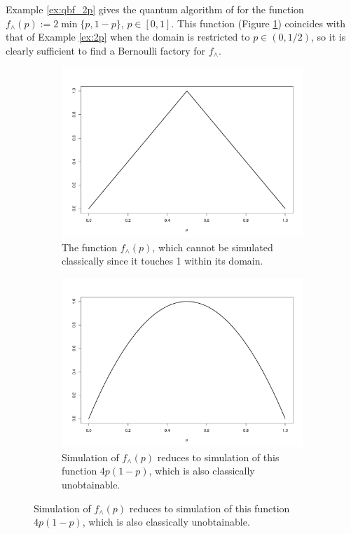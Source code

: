 \documentclass{article}
\theoremstyle{definition}
\begin{document}
Example \ref{ex:qbf_2p} gives the quantum algorithm of \citet{dale2015} for the function $f_\wedge(p) := 2\min\{p, 1-p\}$, $p\in[0,1]$. This function (Figure \ref{fig:wedge_fn}) coincides with that of Example \ref{ex:2p} when the domain is restricted to $p\in(0,1/2)$, so it is clearly sufficient to find a Bernoulli factory for $f_\wedge$.

\begin{figure}
\centering
\begin{subfigure}{0.45\linewidth}
\centering
\includegraphics[width=\textwidth]{wedge_function.pdf}
\caption{The function $f_\wedge(p)$, which cannot be simulated classically since it touches 1 within its domain.}
\label{fig:wedge_fn}
\end{subfigure}%
\hfill
\begin{subfigure}{0.45\linewidth}
\centering
\includegraphics[width=\textwidth]{wedge_qbf_fn.pdf}
\caption{Simulation of $f_\wedge(p)$ reduces to simulation of this function $4p(1-p)$, which is also classically unobtainable.}
\label{fig:wedge_qbf_fn}
\end{subfigure}
\end{figure}
\end{document}
